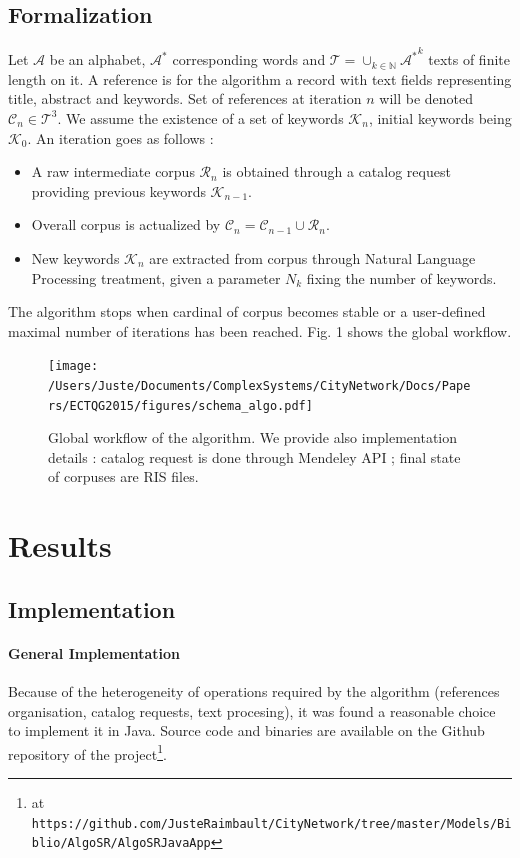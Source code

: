 \subsection{Formalization}
Let $\mathcal{A}$ be an alphabet, $\mathcal{A}^{\ast}$ corresponding words and $\mathcal{T}=\cup_{k\in \mathbb{N}}{\mathcal{A}^{\ast}}^k$ texts of finite length on it. A reference is for the algorithm a record with text fields representing title, abstract and keywords. Set of references at iteration $n$ will be denoted $\mathcal{C}_{n}\in \mathcal{T}^3$. We assume the existence of a set of keywords $\mathcal{K}_n$, initial keywords being $\mathcal{K}_0$. An iteration goes as follows :
\begin{itemize}
\item A raw intermediate corpus $\mathcal{R}_n$ is obtained through a catalog request providing previous keywords $\mathcal{K}_{n-1}$.
\item Overall corpus is actualized by $\mathcal{C}_n = \mathcal{C}_{n-1} \cup \mathcal{R}_n$.
\item New keywords $\mathcal{K}_n$ are extracted from corpus through Natural Language Processing treatment, given a parameter $N_k$ fixing the number of keywords.
\end{itemize}

The algorithm stops when cardinal of corpus becomes stable or a user-defined maximal number of iterations has been reached. Fig. 1 shows the global workflow.

\begin{figure}
\centering
\texttt{[image: /Users/Juste/Documents/ComplexSystems/CityNetwork/Docs/Papers/ECTQG2015/figures/schema\_algo.pdf]}
\caption{Global workflow of the algorithm. We provide also implementation details : catalog request is done through Mendeley API ; final state of corpuses are RIS files.}
\label{fig:algo}
\end{figure}




\section{Results}

\subsection{Implementation}

\paragraph{General Implementation}
Because of the heterogeneity of operations required by the algorithm (references organisation, catalog requests, text procesing), it was found a reasonable choice to implement it in Java. Source code and binaries are available on the Github repository of the project\footnote{at \texttt{https://github.com/JusteRaimbault/CityNetwork/tree/master/Models/Biblio/AlgoSR/AlgoSRJavaApp}}.

